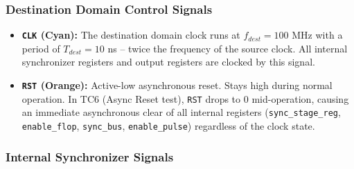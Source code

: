 \documentclass[12pt,a4paper]{article}
\begin{document}
\subsubsection{Destination Domain Control Signals}

\begin{itemize}
    \item \textbf{\texttt{CLK} (Cyan):} The destination domain clock runs at $f_{dest} = 100$ MHz with a period of $T_{dest} = 10$ ns -- twice the frequency of the source clock. All internal synchronizer registers and output registers are clocked by this signal.
    
    \item \textbf{\texttt{RST} (Orange):} Active-low asynchronous reset. Stays high during normal operation. In TC6 (Async Reset test), \texttt{RST} drops to 0 mid-operation, causing an immediate asynchronous clear of all internal registers (\texttt{sync\_stage\_reg}, \texttt{enable\_flop}, \texttt{sync\_bus}, \texttt{enable\_pulse}) regardless of the clock state.
\end{itemize}

\subsubsection{Internal Synchronizer Signals}
\end{document}
